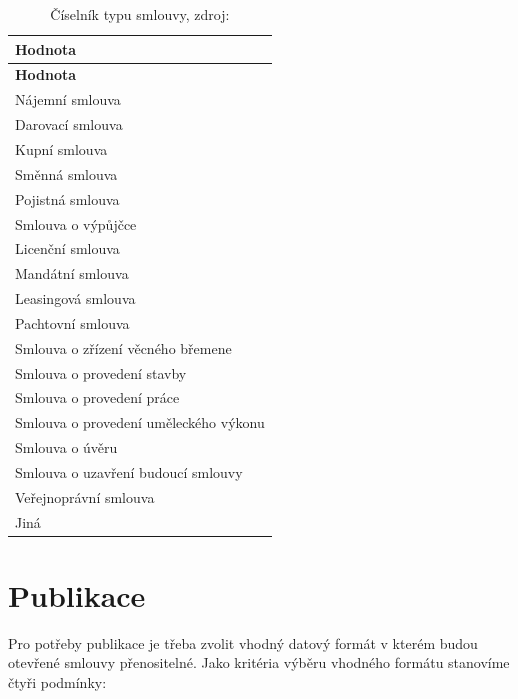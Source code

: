 \begin{center}
\centering
\begin{longtable}[c]{l}
\label{tbl:cisTypsmlouvy} \\
\multicolumn{1}{l}{\textbf{Hodnota}} \\ \hline 
\endfirsthead
\multicolumn{1}{l}{\textbf{Hodnota}} \\ \hline 
\hline
\endhead
\endfoot
\caption[Číselník typu smlouvy]{Číselník typu smlouvy, zdroj:\cite{metodika, standard}}
\endlastfoot
\rowcolor{validateB}Nájemní smlouva \\
\rowcolor{validateB}Darovací smlouva \\
\rowcolor{validateB}Kupní smlouva \\
\rowcolor{validateB}Směnná smlouva \\
\rowcolor{validateB}Pojistná smlouva \\
\rowcolor{validateB}Smlouva o výpůjčce \\
\rowcolor{validateB}Licenční smlouva \\
\rowcolor{validateB}Mandátní smlouva \\
\rowcolor{validateB}Leasingová smlouva \\
\rowcolor{validateB}Pachtovní smlouva \\
\rowcolor{validateB}Smlouva o zřízení věcného břemene \\
\rowcolor{validateB}Smlouva o provedení stavby \\
\rowcolor{validateB}Smlouva o provedení práce \\
\rowcolor{validateB}Smlouva o provedení uměleckého výkonu \\
\rowcolor{validateB}Smlouva o úvěru \\
\rowcolor{validateB}Smlouva o uzavření budoucí smlouvy \\
\rowcolor{validateB}Veřejnoprávní smlouva \\
\rowcolor{validateB}Jiná \\
\end{longtable}
\end{center}

\newpage

\section{Publikace}

Pro potřeby publikace je třeba zvolit vhodný datový formát v kterém budou otevřené smlouvy přenositelné. Jako kritéria výběru vhodného formátu stanovíme čtyři podmínky:

